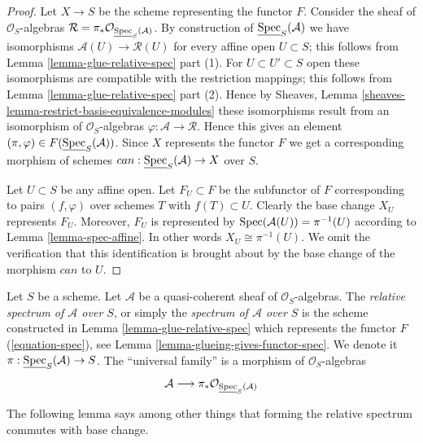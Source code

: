 \begin{proof}
Let $X \to S$ be the scheme representing the functor $F$.
Consider the sheaf of $\mathcal{O}_S$-algebras
$\mathcal{R} = \pi_*\mathcal{O}_{\underline{\mathop{\mathrm{Spec}}}_S(\mathcal{A})}$.
By construction of $\underline{\mathop{\mathrm{Spec}}}_S(\mathcal{A})$
we have isomorphisms $\mathcal{A}(U) \to \mathcal{R}(U)$
for every affine open $U \subset S$; this follows from
Lemma \ref{lemma-glue-relative-spec} part (1).
For $U \subset U' \subset S$ open these isomorphisms are
compatible with the restriction mappings; this follows from
Lemma \ref{lemma-glue-relative-spec} part (2).
Hence by Sheaves, Lemma \ref{sheaves-lemma-restrict-basis-equivalence-modules}
these isomorphisms result from an isomorphism of $\mathcal{O}_S$-algebras
$\varphi : \mathcal{A} \to \mathcal{R}$. Hence this gives an element
$(\pi, \varphi) \in F(\underline{\mathop{\mathrm{Spec}}}_S(\mathcal{A}))$.
Since $X$ represents the functor $F$ we get a corresponding
morphism of schemes $can : \underline{\mathop{\mathrm{Spec}}}_S(\mathcal{A}) \to X$
over $S$.

\medskip\noindent
Let $U \subset S$ be any affine open. Let $F_U \subset F$ be
the subfunctor of $F$ corresponding to pairs $(f, \varphi)$ over
schemes $T$ with $f(T) \subset U$. Clearly the base change
$X_U$ represents $F_U$. Moreover, $F_U$ is represented by
$\mathop{\mathrm{Spec}}(\mathcal{A}(U)) = \pi^{-1}(U)$ according to
Lemma \ref{lemma-spec-affine}. In other words $X_U \cong \pi^{-1}(U)$.
We omit the verification that this identification is brought about
by the base change of the morphism $can$ to $U$.
\end{proof}

\begin{definition}
\label{definition-relative-spec}
Let $S$ be a scheme. Let $\mathcal{A}$ be a quasi-coherent sheaf of
$\mathcal{O}_S$-algebras. The {\it relative spectrum of $\mathcal{A}$ over
$S$}, or simply the {\it spectrum of $\mathcal{A}$ over $S$} is the scheme
constructed in Lemma \ref{lemma-glue-relative-spec} which represents the
functor $F$ (\ref{equation-spec}), see
Lemma \ref{lemma-glueing-gives-functor-spec}.
We denote it $\pi : \underline{\mathop{\mathrm{Spec}}}_S(\mathcal{A}) \to S$.
The ``universal family'' is a morphism of $\mathcal{O}_S$-algebras
$$
\mathcal{A}
\longrightarrow
\pi_*\mathcal{O}_{\underline{\mathop{\mathrm{Spec}}}_S(\mathcal{A})}
$$
\end{definition}

\noindent
The following lemma says among other things that forming the
relative spectrum commutes with base change.

